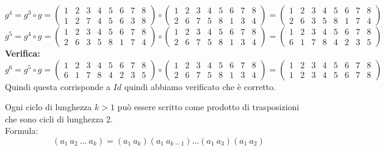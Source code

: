 \documentclass[12pt, letterpaper]{report}
\newcounter{theorem}
\begin{document}
 		$g^4 = g^3 \circ g = \begin{pmatrix}
 			1 & 2 & 3 & 4 & 5 & 6 & 7 & 8 \\
 			1 & 2 & 7 & 4 & 5 & 6 & 3 & 8
 		\end{pmatrix} \circ \begin{pmatrix}
 		1 & 2 & 3 & 4 & 5 & 6 & 7 & 8 \\
 		2 & 6 & 7 & 5 & 8 & 1 & 3 & 4
 		\end{pmatrix} = \begin{pmatrix}
 		1 & 2 & 3 & 4 & 5 & 6 & 7 & 8 \\
 		2 & 6 & 3 & 5 & 8 & 1 & 7 & 4
 		\end{pmatrix}$ \\
 		$g^5 = g^4 \circ g = \begin{pmatrix}
 			1 & 2 & 3 & 4 & 5 & 6 & 7 & 8 \\
 			2 & 6 & 3 & 5 & 8 & 1 & 7 & 4
 		\end{pmatrix} \circ \begin{pmatrix}
 		1 & 2 & 3 & 4 & 5 & 6 & 7 & 8 \\
 		2 & 6 & 7 & 5 & 8 & 1 & 3 & 4
 		\end{pmatrix} = \begin{pmatrix}
 		1 & 2 & 3 & 4 & 5 & 6 & 7 & 8 \\
 		6 & 1 & 7 & 8 & 4 & 2 & 3 & 5
 		\end{pmatrix}$ \\
 		\textbf{Verifica:} \\
 		$g^6 = g^5 \circ g = \begin{pmatrix}
 			1 & 2 & 3 & 4 & 5 & 6 & 7 & 8 \\
 			6 & 1 & 7 & 8 & 4 & 2 & 3 & 5
 		\end{pmatrix} \circ \begin{pmatrix}
 		1 & 2 & 3 & 4 & 5 & 6 & 7 & 8 \\
 		2 & 6 & 7 & 5 & 8 & 1 & 3 & 4
 		\end{pmatrix} = \begin{pmatrix}
 		1 & 2 & 3 & 4 & 5 & 6 & 7 & 8 \\
 		1 & 2 & 3 & 4 & 5 & 6 & 7 & 8
 		\end{pmatrix}$ \\
 		Quindi questa corrisponde a $Id$ quindi abbiamo verificato che è corretto. \\
 		\begin{theorem}{}{}
 		Ogni ciclo di lunghezza $k > 1$ può essere scritto come prodotto di trasposizioni che sono cicli di lunghezza 2. \\
 		Formula:
 		\[
 		(a_1\ a_2\ \dots\ a_k) = (a_1\ a_k)(a_1\ a_{k-1})\dots(a_1\ a_3)(a_1\ a_2)
 		\]
 		\end{theorem}
\end{document}
